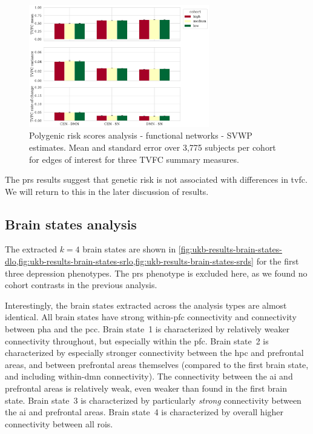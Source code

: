 \begin{figure}[h]
  \centering
  \includegraphics[width=0.7\textwidth]{fig/ukbiobank/TVFC_predictions_summaries/pgs/cohort_comparison/FN/correlation_all_TVFC_summary_measures_SVWP_joint_edges_of_interest}
  \caption{
    Polygenic risk scores analysis - functional networks - SVWP estimates.
    Mean and standard error over 3,775 subjects per cohort for edges of interest for three TVFC summary measures.
  }
  \label{fig:ukb-results-pgs-fn-cohort-comparison-edges-of-interest-wp}
\end{figure}


The \gls{prs} results suggest that genetic risk is not associated with differences in \gls{tvfc}.
We will return to this in the later discussion of results.

\clearpage
\subsection{Brain states analysis}

The extracted $k = 4$ brain states are shown in \cref{fig:ukb-results-brain-states-dlo,fig:ukb-results-brain-states-srlo,fig:ukb-results-brain-states-srds} for the first three depression phenotypes.
The \gls{prs} phenotype is excluded here, as we found no cohort contrasts in the previous analysis.

Interestingly, the brain states extracted across the analysis types are almost identical.
All brain states have strong within-\gls{pfc} connectivity and connectivity between \gls{pha} and the \gls{pcc}.
%
Brain state~1 is characterized by relatively weaker connectivity throughout, but especially within the \gls{pfc}.
%
Brain state~2 is characterized by especially stronger connectivity between the \gls{hpc} and prefrontal areas, and between prefrontal areas themselves (compared to the first brain state, and including within-\gls{dmn} connectivity).
The connectivity between the \gls{ai} and prefrontal areas is relatively weak, even weaker than found in the first brain state.
%
Brain state~3 is characterized by particularly \emph{strong} connectivity between the \gls{ai} and prefrontal areas.
%
Brain state~4 is characterized by overall higher connectivity between all \glspl{roi}.


